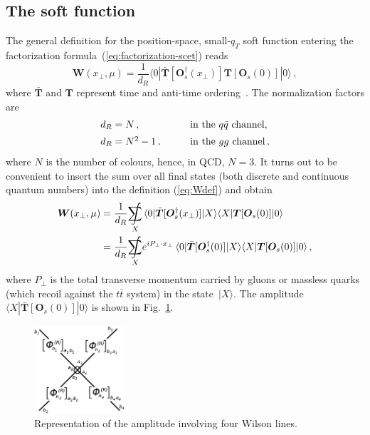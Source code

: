 \documentclass[a4paper,11pt]{article}
\newcommand{\ttbar}{\ensuremath{t \bar t}\xspace}
\newcommand{\qqbar}{{\ensuremath{q \bar q}}\xspace}
\numberwithin{equation}{section}
\begin{document}
\subsection{The soft function}

The general definition for the position-space, small-$q_T$ soft function
entering the factorization formula~(\ref{eq:factorization-scet})
reads~\cite{Li:2013mia}
%
\begin{equation}
  \mathbold{W} (x_\perp,\mu) = \frac{1}{d_R} 
  \langle 0| 
  \mathbold{\bar T} [\mathbold{O}_s^\dagger (x_\perp)] 
  \mathbold{T} [\mathbold{O}_s(0)] 
  |0 \rangle\,,
  \label{eq:Wdef}
\end{equation}
%
where $\mathbold{\bar T}$ and $\mathbold{T}$ represent time and anti-time
ordering~\cite{Becher:2007ty}. The normalization factors are 
%
\begin{equation}
  \begin{array}{ll}
  d_R  = N\,,     & \quad \quad \text{in the $\qqbar$ channel,} 
  \\[0.5em]
  d_R  = N^2-1\,, & \quad \quad \text{in the $gg$ channel\,,}
  \end{array}
\end{equation}
%
where $N$ is the number of colours, hence, in QCD, $N=3$.
%
It turns out to be convenient to insert the sum over all final states (both
discrete and continuous quantum numbers) into the definition (\ref{eq:Wdef}) and
obtain
%
\begin{align}
  \mathbold{W} (x_\perp,\mu) 
  &= 
  \frac{1}{d_R} \ \underset{\!\!X}{\int\kern-1.5em\sum} \,
  \langle 0| \mathbold{\bar T} [\mathbold{O}_s^\dagger (x_\perp)] | X \rangle
  \langle X | \mathbold{T} [\mathbold{O}_s(0)] |0 \rangle \\
  & =
  \frac{1}{d_R} \ \underset{\!\!X}{\int\kern-1.5em\sum} e^{i P_\perp \cdot
  x_\perp}\,
  \langle 0| \mathbold{\bar T} [\mathbold{O}_s^\dagger (0)] | X \rangle
  \langle X | \mathbold{T} [\mathbold{O}_s(0)] |0 \rangle \,,
  \label{eq:Wdef2}
\end{align}
%
where $P_\perp$ is the total transverse momentum carried by gluons or massless
quarks (which recoil against the \ttbar system) in the state~$|X\rangle$.
%
The amplitude  $\langle X | \mathbold{\bar T} [\mathbold{O}_s (0)]
| 0 \rangle$ is shown in Fig.~\ref{fig:SFamp}.  
%
%

\begin{figure}[t]
  \begin{center}
    \includegraphics[width=0.30\textwidth]{plots/SFdefdiag.png}
  \end{center}
  \caption{
  Representation of the amplitude involving four Wilson lines.
  }
  \label{fig:SFamp}
\end{figure}
\end{document}
